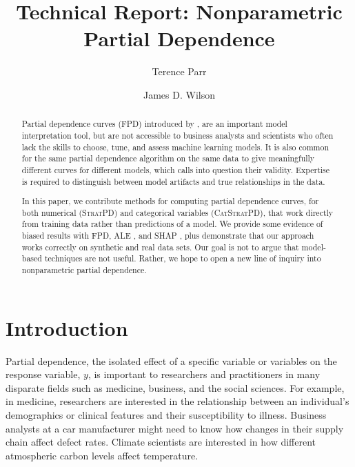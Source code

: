 \documentclass[smallextended]{svjour3}       %
\newcommand{\spd}{\fontfamily{cmr}\textsc{\small StratPD}}
\newcommand{\cspd}{\fontfamily{cmr}\textsc{\small CatStratPD}}
\begin{document}
\title{Technical Report: Nonparametric Partial Dependence}

\author{Terence Parr \and James D. Wilson}



\maketitle

\begin{abstract}
Partial dependence curves (FPD) introduced by \citet{PDP}, are an important model interpretation tool, but are not accessible to business analysts and scientists who often lack the skills to choose, tune, and assess machine learning models.  It is also common for the same partial dependence algorithm on the same data to give meaningfully different curves for different models, which calls into question their validity.  Expertise is required to distinguish between model artifacts and true relationships in the data.

In this paper, we contribute methods for computing partial dependence curves, for both numerical (\spd) and categorical variables (\cspd), that work directly from training data rather than predictions of a model. We provide some evidence of biased results with FPD, ALE \citep{ALE}, and SHAP \citep{shap}, plus demonstrate that our approach works correctly on synthetic and real data sets.  Our goal is not to argue that model-based techniques are not useful. Rather, we hope to open a new line of inquiry into nonparametric partial dependence.
\end{abstract}

\section{Introduction}

Partial dependence, the isolated effect of a specific variable or variables on the response variable, $y$, is important to researchers and practitioners in many disparate fields such as medicine, business, and the social sciences. For example, in medicine, researchers are interested in the relationship between an individual's demographics or clinical features and their susceptibility to illness. Business analysts at a car manufacturer might need to know how changes in their supply chain affect defect rates. Climate scientists are interested in how different atmospheric carbon levels affect temperature.
\end{document}
